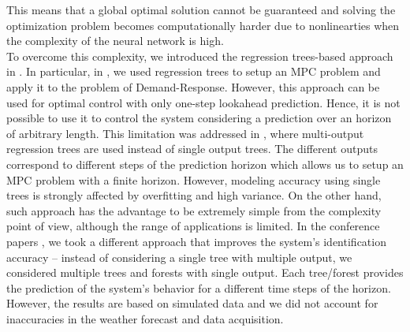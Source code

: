 {This means that a global optimal solution cannot be guaranteed and solving the optimization problem becomes computationally harder due to nonlinearties when the complexity of the neural network is high.
\\
To overcome this complexity, we introduced the regression trees-based approach in \cite{Behl2016,Jain2017TCPS}. 
In particular, in \cite{Behl2016}, we used regression trees to setup an MPC problem and apply it to the problem of Demand-Response. 
However, this approach can be used for optimal control with only one-step lookahead prediction.
Hence, it is not possible to use it to control the system considering a prediction over an horizon of arbitrary length. 
This limitation was addressed in \cite{Jain2017TCPS}, where multi-output regression trees are used instead of single output trees. 
The different outputs correspond to different steps of the prediction horizon which allows us to setup an MPC problem with a finite horizon. 
However, modeling accuracy using single trees is strongly affected by overfitting and high variance. 
On the other hand, such approach has the advantage to be extremely simple from the complexity point of view, although the range of applications is limited. 
In the conference papers \cite{JainACC2017,JainCDC2017}, we took a different approach that improves the system's identification accuracy -- instead of considering a single tree with multiple output, we considered multiple trees and forests with single output. 
Each tree/forest provides the prediction of the system's behavior for a different time steps of the horizon. 
However, the results are based on simulated data and we did not account for inaccuracies in the weather forecast and data acquisition.
}





